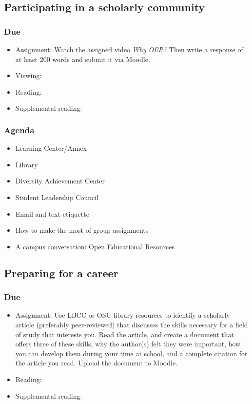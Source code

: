 \documentclass[12pt,article,oneside]{memoir}
\begin{document}
\subsection{Participating in a scholarly community}
\subsubsection{Due}
\begin{itemize}
 \item Assignment: Watch the assigned video \emph{Why OER?}  Then write a response of at least 200 words and submit it via Moodle. 
 \item Viewing: \cite{oer}
 \item Reading: \cite{wellsley}
 \item Supplemental reading: \cite{oer-dh}
\end{itemize}


\subsubsection{Agenda}
\begin{itemize}
 \item Learning Center/Annex
 \item Library
 \item Diversity Achievement Center
 \item Student Leadership Council
 \item Email and text etiquette
 \item How to make the most of group assignments
 \item A campus conversation: Open Educational Resources
\end{itemize}



\subsection{Preparing for a career}
\subsubsection{Due}
\begin{itemize}
 \item Assignment: Use LBCC or OSU library resources to identify a scholarly article (preferably peer-reviewed) that discusses the skills necessary for a field of study that interests you.  Read the article, and create a document that offers three of these skills, why the author(s) felt they were important, how you can develop them during your time at school, and a complete citation for the article you read.  Upload the document to Moodle.
 \item Reading: \cite{worksheets}
 \item Supplemental reading: \cite{crosswalk,ooh}
\end{itemize}
\end{document}
